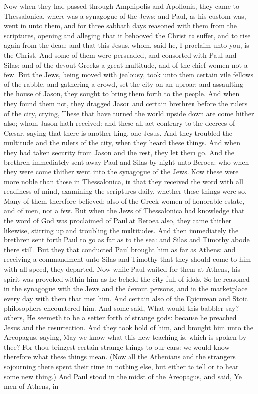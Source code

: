 Now when they had passed through Amphipolis and Apollonia, they came to Thessalonica, where was a synagogue of the Jews: and Paul, as his custom was, went in unto them, and for three sabbath days reasoned with them from the scriptures, opening and alleging that it behooved the Christ to suffer, and to rise again from the dead; and that this Jesus, whom, said he, I proclaim unto you, is the Christ. And some of them were persuaded, and consorted with Paul and Silas; and of the devout Greeks a great multitude, and of the chief women not a few. But the Jews, being moved with jealousy, took unto them certain vile fellows of the rabble, and gathering a crowd, set the city on an uproar; and assaulting the house of Jason, they sought to bring them forth to the people. And when they found them not, they dragged Jason and certain brethren before the rulers of the city, crying, These that have turned the world upside down are come hither also; whom Jason hath received: and these all act contrary to the decrees of Cæsar, saying that there is another king, one Jesus. And they troubled the multitude and the rulers of the city, when they heard these things. And when they had taken security from Jason and the rest, they let them go.  And the brethren immediately sent away Paul and Silas by night unto Beroea: who when they were come thither went into the synagogue of the Jews. Now these were more noble than those in Thessalonica, in that they received the word with all readiness of mind, examining the scriptures daily, whether these things were so. Many of them therefore believed; also of the Greek women of honorable estate, and of men, not a few. But when the Jews of Thessalonica had knowledge that the word of God was proclaimed of Paul at Beroea also, they came thither likewise, stirring up and troubling the multitudes. And then immediately the brethren sent forth Paul to go as far as to the sea: and Silas and Timothy abode there still. But they that conducted Paul brought him as far as Athens: and receiving a commandment unto Silas and Timothy that they should come to him with all speed, they departed.  Now while Paul waited for them at Athens, his spirit was provoked within him as he beheld the city full of idols. So he reasoned in the synagogue with the Jews and the devout persons, and in the marketplace every day with them that met him. And certain also of the Epicurean and Stoic philosophers encountered him. And some said, What would this babbler say? others, He seemeth to be a setter forth of strange gods: because he preached Jesus and the resurrection. And they took hold of him, and brought him unto the Areopagus, saying, May we know what this new teaching is, which is spoken by thee? For thou bringest certain strange things to our ears: we would know therefore what these things mean. (Now all the Athenians and the strangers sojourning there spent their time in nothing else, but either to tell or to hear some new thing.) And Paul stood in the midst of the Areopagus, and said, Ye men of Athens, in 
